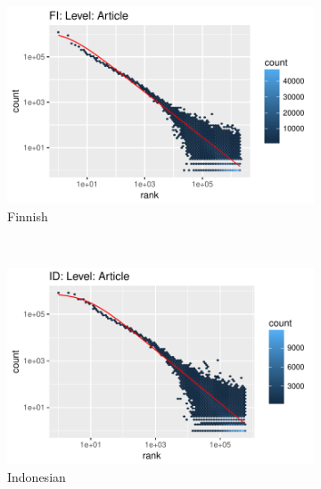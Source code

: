 \documentclass{article}
\begin{document}
\begin{figure}
	\begin{subfigure}[b]{0.3\textwidth}
		\includegraphics[trim={0 0 2.2cm 0.6cm},clip, width=\textwidth]{FI_Article_mle.pdf}
		\caption{Finnish}
		\label{fig:fi_mle}
	\end{subfigure}
	~ %
	\begin{subfigure}[b]{0.3\textwidth}
		\includegraphics[trim={0 0 2.2cm 0.6cm},clip, width=\textwidth]{ID_Article_mle.pdf}
		\caption{Indonesian}
		\label{fig:id_mle}
	\end{subfigure}
	~ %
	\begin{subfigure}[b]{0.3\textwidth}

\end{subfigure}
\end{figure}
\end{document}
